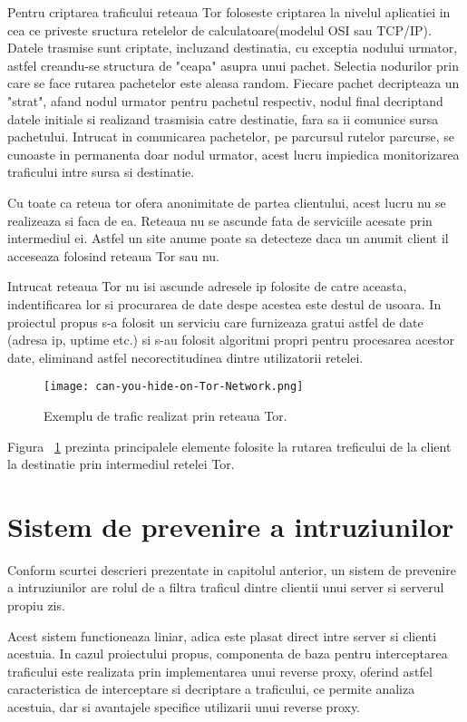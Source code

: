 Pentru criptarea traficului reteaua Tor foloseste criptarea la nivelul aplicatiei in cea ce priveste sructura retelelor de calculatoare(modelul OSI sau TCP/IP). Datele trasmise sunt criptate, incluzand destinatia, cu exceptia nodului urmator, astfel creandu-se structura de "ceapa" asupra unui pachet. Selectia nodurilor prin care se face rutarea pachetelor este aleasa random. Fiecare pachet decripteaza un "strat", afand nodul urmator pentru pachetul respectiv, nodul final decriptand datele initiale si realizand trasmisia catre destinatie, fara sa ii comunice sursa pachetului. Intrucat in comunicarea pachetelor, pe parcursul rutelor parcurse, se cunoaste in permanenta doar nodul urmator, acest lucru impiedica monitorizarea traficului intre sursa si destinatie.


Cu toate ca reteua tor ofera anonimitate de partea clientului, acest lucru nu se realizeaza si faca de ea. Reteaua nu se ascunde fata de serviciile acesate prin intermediul ei. Astfel un site anume poate sa detecteze daca un anumit client il acceseaza folosind reteaua Tor sau nu.

Intrucat reteaua Tor nu isi ascunde adresele ip folosite de catre aceasta, indentificarea lor si procurarea de date despe acestea este destul de usoara. In proiectul propus s-a folosit un serviciu care furnizeaza gratui astfel de date \cite{tot_status}(adresa ip, uptime etc.) si s-au folosit algoritmi propri pentru procesarea acestor date, eliminand astfel necorectitudinea dintre utilizatorii retelei.

\begin{figure}[h]
	\centering
	\texttt{[image: can-you-hide-on-Tor-Network.png]}
	\caption{Exemplu de trafic realizat prin reteaua Tor.}
	\label{fig:tor-example}
\end{figure}

Figura ~\ref{fig:tor-example} prezinta principalele elemente folosite la rutarea treficului de la client la destinatie prin intermediul retelei Tor. \\


\section{Sistem de prevenire a intruziunilor}
Conform scurtei descrieri prezentate in capitolul anterior, un sistem de prevenire a intruziunilor are rolul de a filtra traficul dintre clientii unui server si serverul propiu zis. 

Acest sistem functioneaza liniar, adica este plasat direct intre server si clienti acestuia. In cazul proiectului propus, componenta de baza pentru interceptarea traficului este realizata prin implementarea unui reverse proxy, oferind astfel caracteristica de interceptare si decriptare a traficului, ce permite analiza acestuia, dar si avantajele specifice utilizarii unui reverse proxy.

